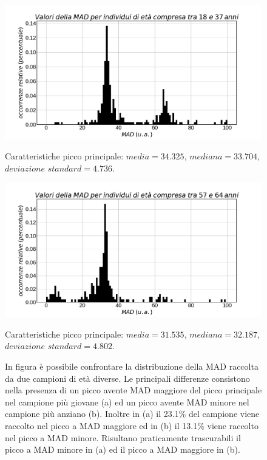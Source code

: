 \documentclass[a4paper, 12pt]{book}
\begin{document}
\begin{figure}[htbp]
\centering
\begin{minipage}[c]{.5\textwidth}
\centering%
\includegraphics[width=\textwidth]{MAD-y.jpg}
\caption{Caratteristiche picco principale: $media=34.325$, $mediana=33.704$, $deviazione$ $standard=4.736$.}
\end{minipage}%
\hspace{10mm}%
\begin{minipage}[c]{.5\textwidth}
\centering%
\includegraphics[width=\textwidth]{MAD-o.jpg}
\caption{Caratteristiche picco principale: $media=31.535$, $mediana=32.187$, $deviazione$ $standard=4.802$.}
\end{minipage}
\caption{In figura è possibile confrontare la distribuzione della MAD raccolta da due campioni di età diverse.
    Le principali differenze consistono nella presenza di un picco avente MAD maggiore del picco principale nel campione più giovane (a) ed un picco avente MAD minore nel campione più anziano (b).
    Inoltre in (a) il 23.1\% del campione viene raccolto nel picco a MAD maggiore ed in (b) il 13.1\% viene raccolto nel picco a MAD minore.
    Risultano praticamente trascurabili il picco a MAD minore in (a) ed il picco a MAD maggiore in (b).
}
\label{fig:MAD}
\end{figure}
\end{document}
